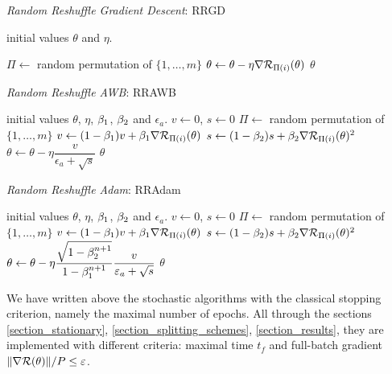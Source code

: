 \begin{algorithm}[h!]
	\caption{{\it Random Reshuffle Gradient Descent}: RRGD}
	\begin{algorithmic}
		\REQUIRE initial values $\theta$ and $\eta$.
		
		\STATE $\Pi \leftarrow$ random permutation of $\{1,\dots,m\}$
		\STATE $\theta \leftarrow \theta-\eta \nabla \mathcal{R}_{\Pi(i)}(\theta)$
		\ENDFOR
		\ENDFOR
		\RETURN $\theta$
	\end{algorithmic}
	\label{algo_RRGD}
\end{algorithm} 

\begin{algorithm}[h!]
	\caption{{\it Random Reshuffle AWB}: RRAWB}
	\begin{algorithmic}
		\REQUIRE initial values $\theta$, $\eta$, $\beta_1$, $\beta_2$ and $\epsilon_a$.
		\STATE $v\leftarrow 0$, $s\leftarrow 0$
		\FOR{$n=0, \dots, n_{max}-1$}
		\STATE $\Pi \leftarrow$ random permutation of $\{1,\dots,m\}$
		\FOR{$i=1, \dots, m$}
		\STATE $v \leftarrow(1-\beta_1)v + \beta_1 \nabla \mathcal{R}_{\Pi(i)}(\theta)$
		\STATE $s \leftarrow (1-\beta_2)s + \beta_2 \nabla \mathcal{R}_{\Pi(i)}(\theta)^2$
		\STATE $\theta \leftarrow \theta -\eta \dfrac{v}{\epsilon_a+\sqrt{s}}$
		\ENDFOR
		\ENDFOR
		\RETURN $\theta$
	\end{algorithmic}
	\label{algo_RRAWB}
\end{algorithm} 

\begin{algorithm}[h!]
	\caption{{\it Random Reshuffle Adam}: RRAdam}
	\begin{algorithmic}
		\REQUIRE initial values $\theta$, $\eta$, $\beta_1$, $\beta_2$ and $\epsilon_a$.
		\STATE $v\leftarrow 0$, $s\leftarrow 0$
		\STATE $\Pi \leftarrow$ random permutation of $\{1,\dots,m\}$
		\STATE $v \leftarrow(1-\beta_1)v + \beta_1 \nabla \mathcal{R}_{\Pi(i)}(\theta)$
		\STATE $s \leftarrow (1-\beta_2)s + \beta_2 \nabla \mathcal{R}_{\Pi(i)}(\theta)^2$
		\STATE $\theta \leftarrow \theta -\eta \dfrac{\sqrt{1-\beta_2^{n+1}}}{1-\beta_1^{n+1}} \dfrac{v}{\varepsilon_a+\sqrt{s}}$
		\ENDFOR
		\ENDFOR
		\RETURN $\theta$
	\end{algorithmic}
	\label{algo_RRAdam}
\end{algorithm} 

\begin{remark}
	We have written above the stochastic algorithms with the classical stopping criterion, namely the maximal number of epochs. All through the sections \ref{section_stationary}, \ref{section_splitting_schemes}, \ref{section_results}, they are implemented with different criteria: maximal time $t_f$ and full-batch gradient $\|\nabla \mathcal{R}(\theta)\|/P \leq \varepsilon$.
\end{remark}

